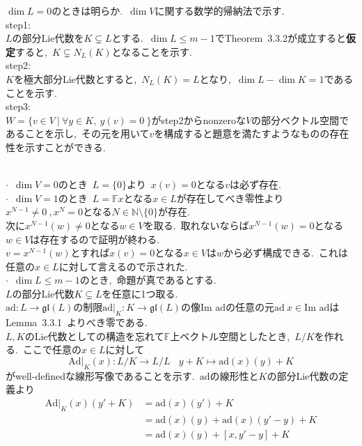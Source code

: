 \documentclass[uplatex,dvipdfmx]{jsarticle}
\begin{document}
$\dim L=0$のときは明らか.~$\dim V $に関する数学的帰納法で示す.\\
step1:\\
$L$の部分Lie代数を$K\subsetneq L$とする.~$\dim L\leq m-1$でTheorem~3.3.2が成立すると\textbf{仮定}すると,~$K \subsetneq N_L(K)$となることを示す.\\
step2:\\
$K$を極大部分Lie代数とすると,~$N_L(K)=L$となり,~$\dim L - \dim K =1$であることを示す.\\
step3:\\
$W=\{v\in V ~|~\forall y \in K ,~y(v)=0~\}$がstep2からnonzeroな$V$の部分ベクトル空間であることを示し,~その元を用いて$v$を構成すると題意を満たすようなものの存在性を示すことができる.\\\\
\begin{myproof}
$\cdot$~$\dim V=0$のとき~$L=\{0\}$より~$x(v)=0$となる$v$は必ず存在.\\
$\cdot$~$\dim V=1$のとき~$L=\mathbb{F}x$となる$x\in L$が存在してべき零性より$x^{N-1} \neq 0 ~, x^N =0$となる$N\in \mathbb{N}\setminus \{0\}$が存在.\\
次に$x^{N-1}(w)\neq 0$となる$w\in V$を取る.~取れないならば$x^{N-1}(w)=0$となる$w\in V$は存在するので証明が終わる.\\
$v=x^{N-1}(w)$とすれば$x(v)=0$となる$x\in V$は$w$から必ず構成できる.~これは任意の$x\in L$に対して言えるので示された.\\
$\cdot $~$\dim L \leq m-1$のとき,~命題が真であるとする.\\
$L$の部分Lie代数$K \subsetneq L$を任意に1つ取る.\\
$\text{ad}:L\to \mathfrak{gl}(L)$の制限$\text{ad}|_K:K\to \mathfrak{gl}(L)$の像$\text{Im~ad} $の任意の元$\text{ad}~x\in \text{Im~ad}$はLemma~3.3.1~よりべき零である.\\
$L,K$のLie代数としての構造を忘れて$\mathbb{F}$上ベクトル空間としたとき,~$L/K$を作れる.~ここで任意の$x\in L$に対して
\begin{equation*}
    \text{Ad}|_K(x):L/K\to L/L ~~~~y+K \mapsto\text{ad}(x)(y)+K
\end{equation*}
がwell-definedな線形写像であることを示す.~$\text{ad}$の線形性と$K$の部分Lie代数の定義より
\begin{equation*}
    \begin{split}
        \text{Ad}|_K(x)(y'+K)&=\text{ad}(x)(y')+K\\
        &=\text{ad}(x)(y)+\text{ad}(x)(y'-y)+K\\
        &=\text{ad}(x)(y)+[x,y'-y]+K\\

\end{split}
\end{equation*}
\end{myproof}
\end{document}

